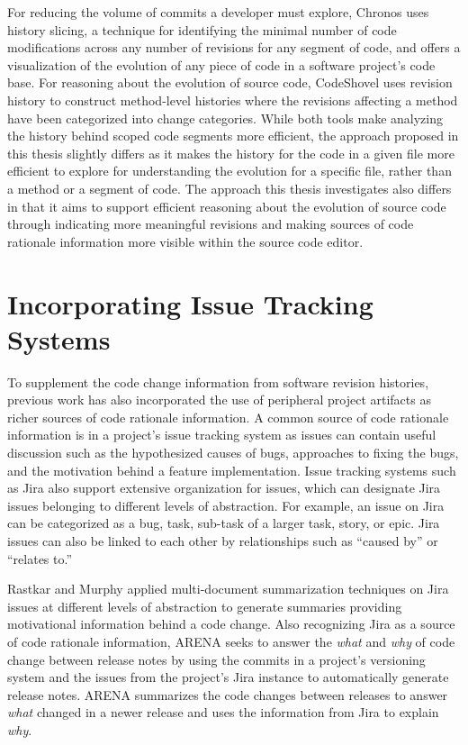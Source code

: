 For reducing the volume of commits a developer must explore, Chronos \cite{servant_history_2012} uses history slicing, a technique for identifying the minimal number of code modifications across any number of revisions for any segment of code, and offers a visualization of the evolution of any piece of code in a software project's code base.
For reasoning about the evolution of source code, CodeShovel \cite{grund_codeshovel_2021} uses revision history to construct method-level histories where the revisions affecting a method have been categorized into change categories.
While both tools make analyzing the history behind scoped code segments more efficient, the approach proposed in this thesis slightly differs as it makes the history for the code in a given file more efficient to explore for understanding the evolution for a specific file, rather than a method or a segment of code.
The approach this thesis investigates also differs in that it aims to support efficient reasoning about the evolution of source code through indicating more meaningful revisions and making sources of code rationale information more visible within the source code editor.

\section{Incorporating Issue Tracking Systems}

To supplement the code change information from software revision histories, previous work has also incorporated the use of peripheral project artifacts as richer sources of code rationale information. A common source of code rationale information is in a project's issue tracking system as issues can contain useful discussion such as the hypothesized causes of bugs, approaches to fixing the bugs, and the motivation behind a feature implementation. 
Issue tracking systems such as Jira also support extensive organization for issues, which can designate Jira issues belonging to different levels of abstraction.
For example, an issue on Jira can be categorized as a bug, task, sub-task of a larger task, story, or epic. \cite{jira-issue-types}
Jira issues can also be linked to each other by relationships such as ``caused by'' or ``relates to.''

Rastkar and Murphy \cite{rastkar_why_2013} applied multi-document summarization techniques on Jira issues at different levels of abstraction to generate summaries providing motivational information behind a code change.
Also recognizing Jira as a source of code rationale information, ARENA \cite{moreno_arena_2017} seeks to answer the \emph{what} and \emph{why} of code change between release notes by using the commits in a project's versioning system and the issues from the project's Jira instance to automatically generate release notes. 
ARENA summarizes the code changes between releases to answer \emph{what} changed in a newer release and uses the information from Jira to explain \emph{why}.

